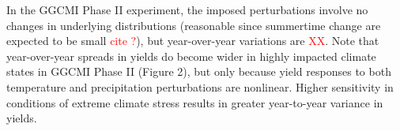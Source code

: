 In the GGCMI Phase II experiment, the imposed perturbations involve no changes in underlying distributions (reasonable since summertime change are expected to be small \textcolor{red}{cite ?}), but year-over-year variations are \textcolor{red}{XX}. 
Note that year-over-year spreads in yields do become wider in highly impacted climate states in GGCMI Phase II (Figure 2), but only because yield responses to both temperature and precipitation perturbations are nonlinear. 
Higher sensitivity in conditions of extreme climate stress results in greater year-to-year variance in yields.




